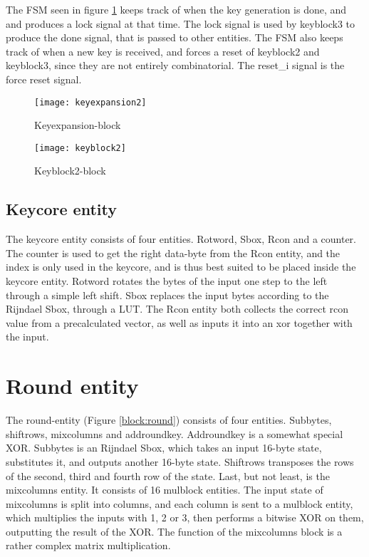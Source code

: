 The FSM seen in figure \ref{block:keyexpansion} keeps track of when the 
key generation is done, and and produces a lock signal at that time. 
The lock signal is used by keyblock3 to produce the done signal, that 
is passed to other entities. 
The FSM also keeps track of when a new key is received, and forces a 
reset of keyblock2 and keyblock3, since they are not entirely 
combinatorial. The reset\_i signal is the force reset signal. 

\begin{figure}[h!]
  \centering
  \texttt{[image: keyexpansion2]}
  \caption{Keyexpansion-block}
  \label{block:keyexpansion}
\end{figure}

\begin{figure}[h!]
  \centering
  \texttt{[image: keyblock2]}
  \caption{Keyblock2-block}
  \label{block:keyblock2}
\end{figure}

\subsection{Keycore entity}
The keycore entity consists of four entities. Rotword, Sbox, Rcon and a 
counter. The counter is used to get the right data-byte from the Rcon 
entity, and the index is only used in the keycore, and is thus best 
suited to be placed inside the keycore entity. Rotword rotates the 
bytes of the input one step to the left through a simple left shift. 
Sbox replaces the input bytes according to the Rijndael Sbox, through 
a LUT. The Rcon entity both collects the correct rcon value from a 
precalculated vector, as well as inputs it into an xor together with 
the input.

\section{Round entity}
The round-entity (Figure \ref{block:round}) consists of four entities. 
Subbytes, shiftrows, mixcolumns and addroundkey. Addroundkey is a 
somewhat special XOR. Subbytes is an Rijndael Sbox, which takes an 
input 16-byte state, substitutes it, and outputs another 16-byte state. 
Shiftrows transposes the rows of the second, third and fourth row of 
the state. Last, but not least, is the mixcolumns entity. It consists 
of 16 mulblock entities. The input state of mixcolumns is split into 
columns, and each column is sent to a mulblock entity, which multiplies 
the inputs with 1, 2 or 3, then performs a bitwise XOR on them, 
outputting the result of the XOR. The function of the mixcolumns block 
is a rather complex matrix multiplication.

